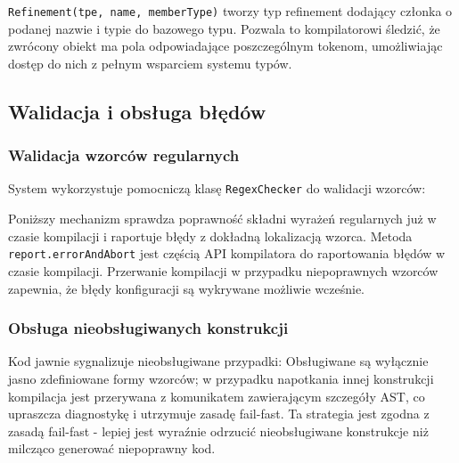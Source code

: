 \texttt{Refinement(tpe, name, memberType)} tworzy typ refinement dodający członka o podanej nazwie i typie do bazowego typu.
Pozwala to kompilatorowi śledzić, że zwrócony obiekt ma pola odpowiadające poszczególnym tokenom, umożliwiając dostęp do nich z pełnym wsparciem systemu typów.

\subsection{Walidacja i obsługa błędów}\label{subsec:walidacja-i-obsuga-bedow}

\subsubsection{Walidacja wzorców regularnych}\label{subsubsec:walidacja-wzorcow-regularnych}

System wykorzystuje pomocniczą klasę \texttt{RegexChecker} do walidacji wzorców:

Poniższy mechanizm sprawdza poprawność składni wyrażeń regularnych już w czasie kompilacji i raportuje błędy z dokładną lokalizacją wzorca.
Metoda \texttt{report.errorAndAbort} jest częścią API kompilatora do raportowania błędów w czasie kompilacji.
Przerwanie kompilacji w przypadku niepoprawnych wzorców zapewnia, że błędy konfiguracji są wykrywane możliwie wcześnie.

\subsubsection{Obsługa nieobsługiwanych konstrukcji}\label{subsubsec:obsuga-nieobsugiwanych-konstrukcji}

Kod jawnie sygnalizuje nieobsługiwane przypadki:
Obsługiwane są wyłącznie jasno zdefiniowane formy wzorców; w przypadku napotkania innej konstrukcji kompilacja jest przerywana z komunikatem zawierającym szczegóły AST, co upraszcza diagnostykę i utrzymuje zasadę fail-fast.
Ta strategia jest zgodna z zasadą fail-fast - lepiej jest wyraźnie odrzucić nieobsługiwane konstrukcje niż milcząco generować niepoprawny kod.
